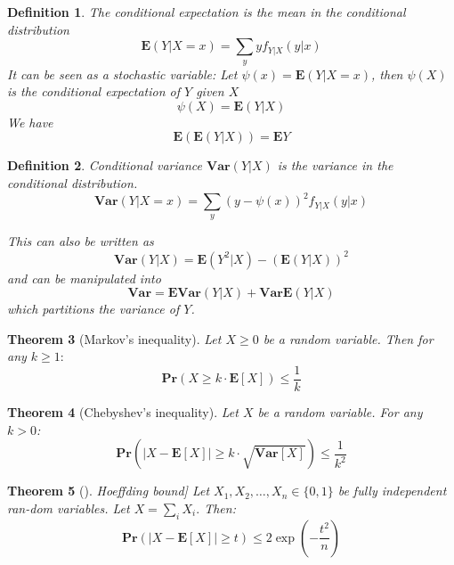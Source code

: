 \documentclass[11pt]{article}
\newcommand{\Ppb}{\mathbf{Pr}}
\newcommand{\Es}{\mathbf{E}}
\newcommand{\Var}{\mathbf{Var}}
\newtheorem{theorem}{Theorem}
\newtheorem{definition}[theorem]{Definition}
\begin{document}
\begin{definition}
The conditional expectation is the mean in the conditional distribution
\begin{equation}
\Es(Y | X=x)=\sum_{y} y f_{Y | X}(y | x)
\end{equation}
It can be seen as a stochastic variable: Let $\psi(x)=\Es(Y | X=x)$,
then $\psi(X)$ is the conditional expectation of $Y$ given $X$
\begin{equation}
\psi(X)=\Es(Y | X)
\end{equation}
We have
\begin{equation}
\Es(\Es(Y | X))=\Es Y
\end{equation}
\end{definition}

\begin{definition}
Conditional variance $\Var(Y|X)$ is the variance in the conditional distribution.
\begin{equation}
\Var(Y | X=x)=\sum_{y}(y-\psi(x))^{2} f_{Y | X}(y | x)
\end{equation}

This can also be written as
$$
\Var(Y | X)=\Es\left(Y^{2} | X\right)-(\Es(Y | X))^{2}
$$
and can be manipulated into
$$
\Var=\Es \Var(Y | X)+\Var \Es(Y | X)
$$
which partitions the variance of $Y$.
\end{definition}

\begin{theorem}[Markov's inequality]
Let $X \geq 0$ be a random variable. Then for any $k \geq 1:$
\begin{equation}
\Ppb(X \geq k \cdot \Es[X]) \leq \frac{1}{k}
\end{equation}
\end{theorem}
\begin{theorem}[Chebyshev's inequality]
Let $X$ be a random variable. For any $k>0$:
\begin{equation}
\Ppb(|X-\Es[X]| \geq k \cdot \sqrt{\Var[X]}) \leq \frac{1}{k^{2}}
\end{equation}
\end{theorem}
\begin{theorem}[]Hoeffding bound]
Let $X_{1}, X_{2}, \ldots, X_{n} \in\{0,1\}$ be fully independent ran-dom variables. Let $X=\sum_{i} X_{i} .$ Then:
\begin{equation}
    \Ppb(|X-\Es[X]| \geq t) \leq 2 \exp \left(-\frac{t^{2}}{n}\right)
\end{equation}
\end{theorem}


\end{document}
